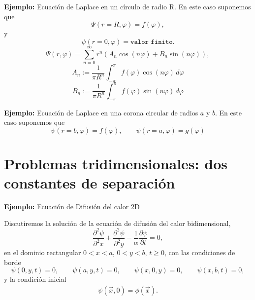 \textbf{Ejemplo:} Ecuación de Laplace en un círculo de radio R. En este caso suponemos que
\begin{equation}
    \Psi(r=R,\varphi)=f(\varphi),
\end{equation}
y
\begin{equation}
    \psi(r=0,\varphi) = \texttt{valor finito}.
\end{equation}
\begin{equation}
    \Psi(r,\varphi)=\sum_{n=0}^\infty r^n\left(A_n\cos(n\varphi)+B_n\sin(n\varphi)\right),
\end{equation}
\begin{equation}
    A_{n}:=\frac{1}{\pi R^{n}}\int_{-\pi}^{\pi}f(\varphi) \cos(n \varphi)\,d\varphi
\end{equation}
\begin{equation}
    B_{n}:=\frac{1}{\pi R^{n}}\int_{-\pi}^{\pi}f(\varphi) \sin(n \varphi)\,d\varphi
\end{equation}

\textbf{Ejemplo:} Ecuación de Laplace en una corona circular de radios $a$ y $b$. En este caso suponemos que
\begin{equation}
    \psi(r=b,\varphi) = f(\varphi), \qquad \psi(r=a,\varphi) = g(\varphi)
\end{equation}

\section{Problemas tridimensionales: dos constantes de separación}
\textbf{Ejemplo:} Ecuación de Difusión del calor 2D

Discutiremos la solución de la ecuación de difusión del calor bidimensional,
\begin{equation}
    \frac{\partial^2 \psi}{\partial^2 x} + \frac{\partial^2 \psi}{\partial^2 y}-\frac{1}{\alpha}\frac{\partial \psi}{\partial t}=0,
\end{equation}
en el dominio rectangular $0<x<a$, $0<y<b$, $t\ge 0$, con las condiciones de borde
\begin{equation}
    \psi(0,y,t)=0, \qquad \psi(a,y,t)=0, \qquad \psi(x,0,y)=0, \qquad \psi(x,b,t)=0,
\end{equation}
y la condición inicial
\begin{align}
    \psi(\vec{x},0) = \phi(\vec{x}).
\end{align}


